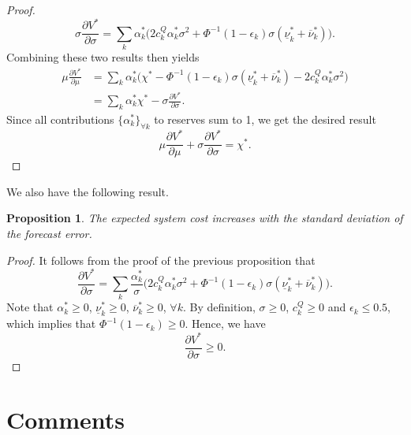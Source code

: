 \documentclass{article}
\newtheorem{proposition}{Proposition}
\begin{document}
\begin{proof}
\begin{equation*}
\sigma \frac{\partial V^*}{\partial \sigma} = \sum_k \alpha_k^*\Big(2c_k^Q\alpha_k^*\sigma^2 + \Phi^{-1}(1-\epsilon_k) \sigma (\underline{\nu}_k^* + \overline{\nu}_k^*)\Big).
\end{equation*}
Combining these two results then yields
\begin{align*}
\mu \frac{\partial V^*}{\partial \mu} &= \sum_k\alpha_k^*\Big(\chi^* - \Phi^{-1}(1-\epsilon_k) \sigma(\underline{\nu}_k^*+\overline{\nu}_k^*) - 2c_k^Q \alpha_k^* \sigma^2\Big)\\
&= \sum_k\alpha_k^*\chi^* - \sigma \frac{\partial V^*}{\partial \sigma}.
\end{align*}
Since all contributions $\{\alpha_k^*\}_{\forall k}$ to reserves sum to 1, we get the desired result
\begin{equation*}
\mu \frac{\partial V^*}{\partial \mu} + \sigma \frac{\partial V^*}{\partial \sigma} = \chi^*.
\end{equation*}
\end{proof}
We also have the following result.
\begin{proposition}
The expected system cost increases with the standard deviation of the forecast error.
\end{proposition}
\begin{proof}
It follows from the proof of the previous proposition that
\begin{equation*}
\frac{\partial V^*}{\partial \sigma} = \sum_k\frac{\alpha_k^*}{\sigma}\Big(2c_k^Q\alpha_k^*\sigma^2 + \Phi^{-1}(1-\epsilon_k) \sigma (\underline{\nu}_k^* + \overline{\nu}_k^*)\Big).
\end{equation*}
Note that $\alpha_k^* \ge 0$, $\underline{\nu}_k^* \ge 0$, $\overline{\nu}_k^* \ge 0$, $\forall k$. By definition, $\sigma \ge 0$, $c_k^Q \ge 0$ and $\epsilon_k \le 0.5$, which implies that $\Phi^{-1}(1-\epsilon_k) \ge 0$. Hence, we have
\begin{equation*}
\frac{\partial V^*}{\partial \sigma} \ge 0.
\end{equation*}
\end{proof}

\section{Comments}
\end{document}
